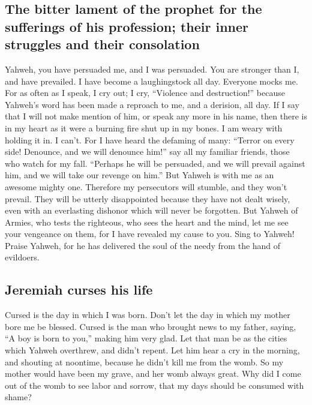 \hypertarget{the-bitter-lament-of-the-prophet-for-the-sufferings-of-his-profession-their-inner-struggles-and-their-consolation}{%
\subsection{The bitter lament of the prophet for the sufferings of his
profession; their inner struggles and their
consolation}\label{the-bitter-lament-of-the-prophet-for-the-sufferings-of-his-profession-their-inner-struggles-and-their-consolation}}

 Yahweh, you have persuaded me, and I was persuaded. You
are stronger than I, and have prevailed. I have become a laughingstock
all day. Everyone mocks me.  For as often as I speak, I
cry out; I cry, ``Violence and destruction!'' because Yahweh's word has
been made a reproach to me, and a derision, all day.  If I
say that I will not make mention of him, or speak any more in his name,
then there is in my heart as it were a burning fire shut up in my bones.
I am weary with holding it in. I can't.  For I have heard
the defaming of many: ``Terror on every side! Denounce, and we will
denounce him!'' say all my familiar friends, those who watch for my
fall. ``Perhaps he will be persuaded, and we will prevail against him,
and we will take our revenge on him.''  But Yahweh is
with me as an awesome mighty one. Therefore my persecutors will stumble,
and they won't prevail. They will be utterly disappointed because they
have not dealt wisely, even with an everlasting dishonor which will
never be forgotten.  But Yahweh of Armies, who tests the
righteous, who sees the heart and the mind, let me see your vengeance on
them, for I have revealed my cause to you.  Sing to
Yahweh! Praise Yahweh, for he has delivered the soul of the needy from
the hand of evildoers.

\hypertarget{jeremiah-curses-his-life}{%
\subsection{Jeremiah curses his life}\label{jeremiah-curses-his-life}}

 Cursed is the day in which I was born. Don't let the day
in which my mother bore me be blessed.  Cursed is the man
who brought news to my father, saying, ``A boy is born to you,'' making
him very glad.  Let that man be as the cities which
Yahweh overthrew, and didn't repent. Let him hear a cry in the morning,
and shouting at noontime,  because he didn't kill me from
the womb. So my mother would have been my grave, and her womb always
great.  Why did I come out of the womb to see labor and
sorrow, that my days should be consumed with shame?

